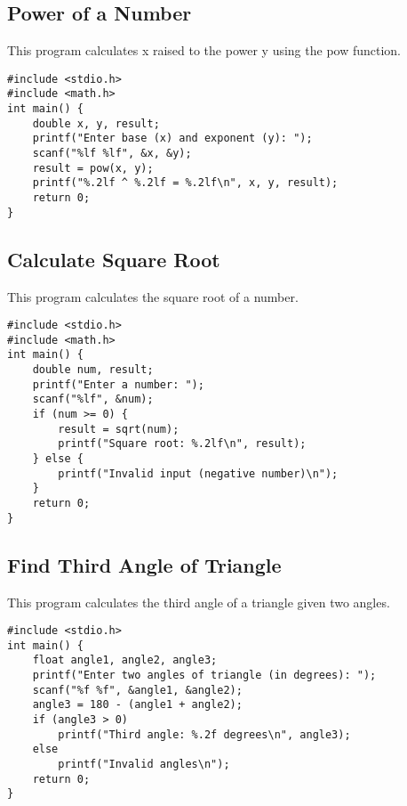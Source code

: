 \documentclass[a4paper,12pt]{article}
\begin{document}
\newpage

\subsection{Power of a Number}
This program calculates x raised to the power y using the pow function.

\begin{lstlisting}[caption={Power of a Number}]
#include <stdio.h>
#include <math.h>
int main() {
    double x, y, result;
    printf("Enter base (x) and exponent (y): ");
    scanf("%lf %lf", &x, &y);
    result = pow(x, y);
    printf("%.2lf ^ %.2lf = %.2lf\n", x, y, result);
    return 0;
}
\end{lstlisting}

\newpage

\subsection{Calculate Square Root}
This program calculates the square root of a number.

\begin{lstlisting}[caption={Calculate Square Root}]
#include <stdio.h>
#include <math.h>
int main() {
    double num, result;
    printf("Enter a number: ");
    scanf("%lf", &num);
    if (num >= 0) {
        result = sqrt(num);
        printf("Square root: %.2lf\n", result);
    } else {
        printf("Invalid input (negative number)\n");
    }
    return 0;
}
\end{lstlisting}

\newpage

\subsection{Find Third Angle of Triangle}
This program calculates the third angle of a triangle given two angles.

\begin{lstlisting}[caption={Find Third Angle of Triangle}]
#include <stdio.h>
int main() {
    float angle1, angle2, angle3;
    printf("Enter two angles of triangle (in degrees): ");
    scanf("%f %f", &angle1, &angle2);
    angle3 = 180 - (angle1 + angle2);
    if (angle3 > 0)
        printf("Third angle: %.2f degrees\n", angle3);
    else
        printf("Invalid angles\n");
    return 0;
}
\end{lstlisting}
\end{document}

